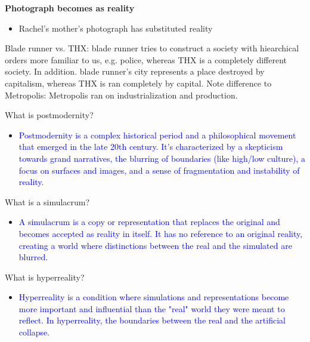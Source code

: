 \documentclass[11pt,fleqn]{book}
\begin{document}
\textbf{Photograph becomes as reality}
\begin{itemize}
    \item Rachel's mother's photograph has substituted reality
\end{itemize}

\begin{remark}
    Blade runner vs. THX: blade runner tries to construct a society with hiearchical orders more familiar to us, e.g. police, whereas THX is a completely different society. In addition. blade runner's city represents a place destroyed by capitalism, whereas THX is ran completely by capital. Note difference to Metropolis: Metropolis ran on industrialization and production.
\end{remark}

\begin{exercise}
What is postmodernity?
\begin{itemize}
\item \textcolor{blue}{Postmodernity is a complex historical period and a philosophical movement that emerged in the late 20th century. It's characterized by a skepticism towards grand narratives, the blurring of  boundaries (like high/low culture), a focus on surfaces and images, and a sense of fragmentation and instability of reality. }
\end{itemize}
\end{exercise}

\begin{exercise}
What is a simulacrum?
\begin{itemize}
\item \textcolor{blue}{A simulacrum is a copy or representation that replaces the original and becomes accepted as reality in itself. It has no reference to an original reality, creating a world where distinctions between the real and the simulated are blurred.}
\end{itemize}
\end{exercise}

\begin{exercise}
What is hyperreality?
\begin{itemize}
\item \textcolor{blue}{Hyperreality is a condition where simulations and representations become more important and influential than the "real" world they were meant to reflect. In hyperreality, the boundaries between the real and the artificial collapse.}
\end{itemize}
\end{exercise}
\end{document}
